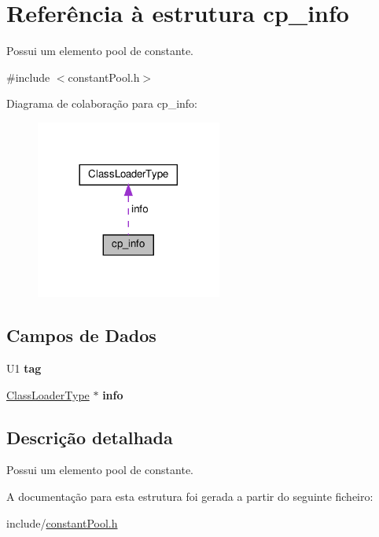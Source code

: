 \hypertarget{structcp__info}{}\section{Referência à estrutura cp\+\_\+info}
\label{structcp__info}


Possui um elemento pool de constante.  




{\ttfamily \#include $<$constant\+Pool.\+h$>$}



Diagrama de colaboração para cp\+\_\+info\+:\nopagebreak
\begin{figure}[H]
\begin{center}
\leavevmode
\includegraphics[width=173pt]{structcp__info__coll__graph}
\end{center}
\end{figure}
\subsection*{Campos de Dados}
\begin{DoxyCompactItemize}
\item 
\mbox{\label{structcp__info_a850b66fa196e9fc2e898ca41d558e248}} 
U1 {\bfseries tag}
\item 
\mbox{\label{structcp__info_aafa07de27e22632ed56ab8fbffbe2559}} 
\hyperlink{unionClassLoaderType}{Class\+Loader\+Type} $\ast$ {\bfseries info}
\end{DoxyCompactItemize}


\subsection{Descrição detalhada}
Possui um elemento pool de constante. 

A documentação para esta estrutura foi gerada a partir do seguinte ficheiro\+:\begin{DoxyCompactItemize}
\item 
include/\hyperlink{constantPool_8h}{constant\+Pool.\+h}\end{DoxyCompactItemize}
